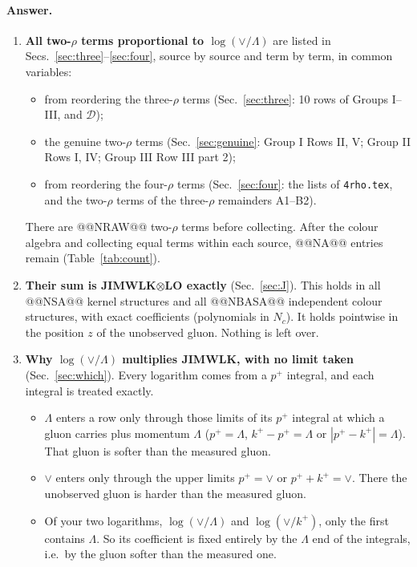 \documentclass[10pt]{article}
\numberwithin{equation}{section}
\begin{document}
\paragraph{Answer.}
\begin{enumerate}
\item \textbf{All two-$\rho$ terms proportional to $\log(\vee/\Lambda)$} are listed in Secs.~\ref{sec:three}--\ref{sec:four}, source by source and term by term, in common variables:
\begin{itemize}
\item from reordering the three-$\rho$ terms (Sec.~\ref{sec:three}: 10 rows of Groups I--III, and $\mathcal D$);
\item the genuine two-$\rho$ terms (Sec.~\ref{sec:genuine}: Group I Rows II, V; Group II Rows I, IV; Group III Row III part 2);
\item from reordering the four-$\rho$ terms (Sec.~\ref{sec:four}: the lists of \texttt{4rho.tex}, and the two-$\rho$ terms of the three-$\rho$ remainders A1--B2).
\end{itemize}
There are @@NRAW@@ two-$\rho$ terms before collecting. After the colour algebra and collecting equal terms within each source, @@NA@@ entries remain (Table~\ref{tab:count}).
\item \textbf{Their sum is JIMWLK$\otimes$LO exactly} (Sec.~\ref{sec:J}). This holds in all @@NSA@@ kernel structures and all @@NBASA@@ independent colour structures, with exact coefficients (polynomials in $N_c$). It holds pointwise in the position $z$ of the unobserved gluon. Nothing is left over.
\item \textbf{Why $\log(\vee/\Lambda)$ multiplies JIMWLK, with no limit taken} (Sec.~\ref{sec:which}). Every logarithm comes from a $p^+$ integral, and each integral is treated exactly.
\begin{itemize}
\item $\Lambda$ enters a row only through those limits of its $p^+$ integral at which a gluon carries plus momentum $\Lambda$ ($p^+=\Lambda$, $k^+-p^+=\Lambda$ or $|p^+-k^+|=\Lambda$). That gluon is softer than the measured gluon.
\item $\vee$ enters only through the upper limits $p^+=\vee$ or $p^++k^+=\vee$. There the unobserved gluon is harder than the measured gluon.
\item Of your two logarithms, $\log(\vee/\Lambda)$ and $\log(\vee/k^+)$, only the first contains $\Lambda$. So its coefficient is fixed entirely by the $\Lambda$ end of the integrals, i.e.\ by the gluon softer than the measured one.

\end{itemize}
\end{enumerate}
\end{document}
